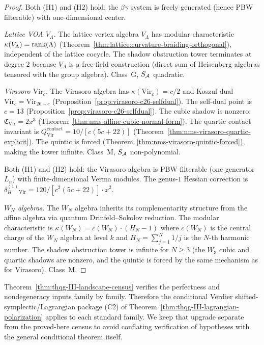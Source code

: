 \begin{proof}
Both (H1) and (H2) hold: the $\beta\gamma$ system is
freely generated (hence PBW filterable) with
one-dimensional center.

\emph{Lattice VOA $V_\Lambda$.}
The lattice vertex algebra $V_\Lambda$ has modular
characteristic $\kappa(V_\Lambda) = \operatorname{rank}(\Lambda)$
(Theorem~\ref{thm:lattice:curvature-braiding-orthogonal}),
independent of the lattice cocycle.
The shadow obstruction tower terminates at degree $2$ because
$V_\Lambda$ is a free-field construction (direct sum
of Heisenberg algebras tensored with the group algebra).
Class~G, $S_{\mathcal{A}}$ quadratic.

\emph{Virasoro $\mathrm{Vir}_c$.}
The Virasoro algebra has $\kappa(\mathrm{Vir}_c) = c/2$
and Koszul dual $\mathrm{Vir}_c^! = \mathrm{Vir}_{26-c}$
(Proposition~\ref{prop:virasoro-c26-selfdual}).
The self-dual point is $c = 13$
(Proposition~\ref{prop:virasoro-c26-selfdual}).
The cubic shadow is nonzero: $\mathfrak{C}_{\mathrm{Vir}} =
2x^3$ (Theorem~\ref{thm:nms-affine-cubic-normal-form}).
The quartic contact invariant is
$Q_{\mathrm{Vir}}^{\mathrm{contact}} = 10/[c(5c+22)]$
(Theorem~\ref{thm:nms-virasoro-quartic-explicit}).
The quintic is forced
(Theorem~\ref{thm:nms-virasoro-quintic-forced}), making the
tower infinite. Class~M, $S_{\mathcal{A}}$ non-polynomial.

Both (H1) and (H2) hold: the Virasoro algebra is
PBW filterable (one generator $L_n$) with finite-dimensional
Verma modules. The genus-$1$ Hessian correction is
$\delta_H^{(1)}_{\mathrm{Vir}}
= 120 / [c^2(5c+22)] \cdot x^2$.

\emph{$W_N$ algebras.}
The $W_N$ algebra inherits its complementarity structure
from the affine algebra via quantum Drinfeld--Sokolov
reduction. The modular characteristic is
$\kappa(W_N) = c(W_N)\cdot(H_N - 1)$ where $c(W_N)$ is the central
charge of the $W_N$ algebra at level $k$ and
$H_N = \sum_{j=1}^{N} 1/j$ is the $N$-th harmonic number.
The shadow obstruction tower is infinite for $N \ge 3$ (the $W_3$ cubic
and quartic shadows are nonzero, and the quintic is forced
by the same mechanism as for Virasoro). Class~M.
\end{proof}

\begin{remark}
\label{rem:thqg-III-landscape-c2}
Theorem~\ref{thm:thqg-III-landscape-census} verifies the
perfectness and nondegeneracy inputs family by family. Therefore the
conditional Verdier shifted-symplectic/Lagrangian package
\textup{(}C2\textup{)} of
Theorem~\ref{thm:thqg-III-lagrangian-polarization} applies to each
standard family. We keep that upgrade separate from the proved-here
census to avoid conflating verification of hypotheses with the
general conditional theorem itself.
\end{remark}

